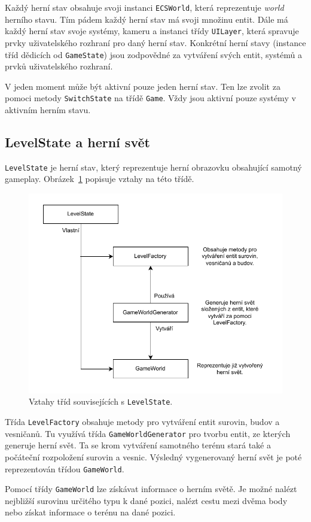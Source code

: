 Každý herní stav obsahuje svoji instanci \texttt{ECSWorld}, která reprezentuje \textit{world} herního stavu. Tím pádem každý herní stav má svoji množinu entit. Dále má každý herní stav svoje systémy, kameru a instanci třídy \texttt{UILayer}, která spravuje prvky uživatelského rozhraní pro daný herní stav. Konkrétní herní stavy (instance tříd dědicích od \texttt{GameState}) jsou zodpovědné za vytváření svých entit, systémů a prvků uživatelského rozhraní.

V jeden moment může být aktivní pouze jeden herní stav. Ten lze zvolit za pomoci metody \texttt{SwitchState} na třídě \texttt{Game}. Vždy jsou aktivní pouze systémy v aktivním herním stavu.

\subsection{LevelState a herní svět}
\texttt{LevelState} je herní stav, který reprezentuje herní obrazovku obsahující samotný gameplay. Obrázek~\ref{fig:level-state} popisuje vztahy na této třídě.

\begin{figure}[!htb]
  \centering
  \includegraphics[width=0.7\linewidth]{img/level-state.pdf}
  \caption{Vztahy tříd souvisejících s \texttt{LevelState}.}
  \label{fig:level-state}
\end{figure}

Třída \texttt{LevelFactory} obsahuje metody pro vytváření entit surovin, budov a vesničanů. Tu využívá třída \texttt{GameWorldGenerator} pro tvorbu entit, ze kterých generuje herní svět. Ta se krom vytváření samotného terénu stará také a počáteční rozpoložení surovin a vesnic. Výsledný vygenerovaný herní svět je poté reprezentován třídou \texttt{GameWorld}.

Pomocí třídy \texttt{GameWorld} lze získávat informace o herním světě. Je možné nalézt nejbližší surovinu určitého typu k dané pozici, nalézt cestu mezi dvěma body nebo získat informace o terénu na dané pozici.

